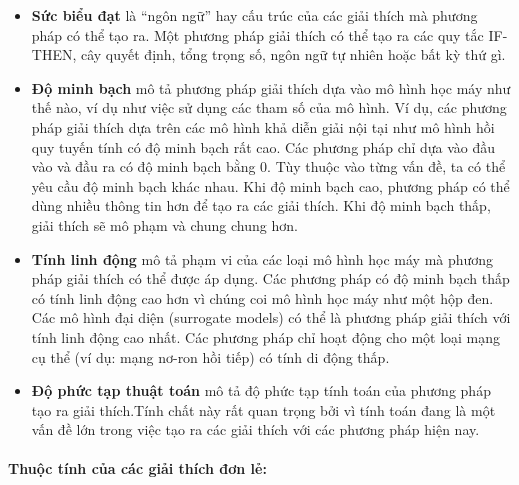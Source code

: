 \begin{itemize}
    \item \textbf{Sức biểu đạt} là ``ngôn ngữ'' hay cấu trúc của các giải thích mà phương pháp có thể tạo ra. Một phương pháp giải thích có thể tạo ra các quy tắc IF-THEN, cây quyết định, tổng trọng số, ngôn ngữ tự nhiên hoặc bất kỳ thứ gì.
    
    \item \textbf{Độ minh bạch} mô tả phương pháp giải thích dựa vào mô hình học máy như thế nào, ví dụ như việc sử dụng các tham số của mô hình. Ví dụ, các phương pháp giải thích dựa trên các mô hình khả diễn giải nội tại như mô hình hồi quy tuyến tính có độ minh bạch rất cao. Các phương pháp chỉ dựa vào đầu vào và đầu ra có độ minh bạch bằng 0. Tùy thuộc vào từng vấn đề, ta có thể yêu cầu độ minh bạch khác nhau. Khi độ minh bạch cao, phương pháp có thể dùng nhiều thông tin hơn để tạo ra các giải thích. Khi độ minh bạch thấp, giải thích sẽ mô phạm và chung chung hơn.
    
    \item \textbf{Tính linh động} mô tả phạm vi của các loại mô hình học máy mà phương pháp giải thích có thể được áp dụng. Các phương pháp có độ minh bạch thấp có tính linh động cao hơn vì chúng coi mô hình học máy như một hộp đen. Các mô hình đại diện (surrogate models) có thể là phương pháp giải thích với tính linh động cao nhất. Các phương pháp chỉ hoạt động cho một loại mạng cụ thể (ví dụ: mạng nơ-ron hồi tiếp) có tính di động thấp.

    \item \textbf{Độ phức tạp thuật toán} mô tả độ phức tạp tính toán của phương pháp tạo ra giải thích.Tính chất này rất quan trọng bởi vì tính toán đang là một vấn đề lớn trong việc tạo ra các giải thích với các phương pháp hiện nay.
\end{itemize}

\paragraph{Thuộc tính của các giải thích đơn lẻ:}

